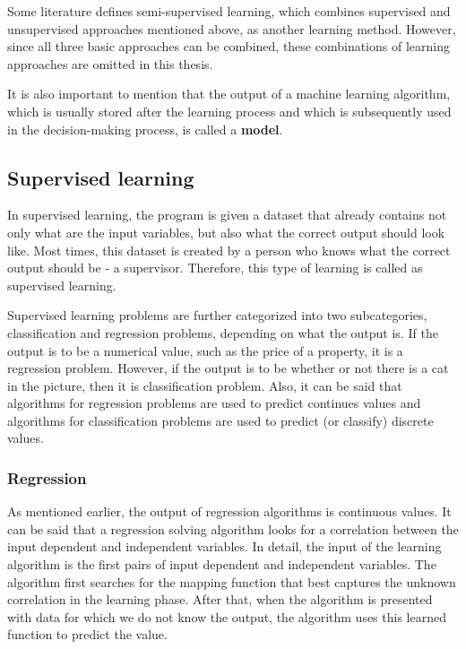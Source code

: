 Some literature\cite{ml-types1,ml-types2} defines semi-supervised learning, which combines supervised and unsupervised approaches mentioned above, as another learning method. However, since all three basic approaches can be combined, these combinations of learning approaches are omitted in this thesis.

It is also important to mention that the output of a machine learning algorithm, which is usually stored after the learning process and which is subsequently used in the decision-making process, is called a \textbf{model}\cite{algorithms-vs-models}.

\subsection{Supervised learning}

In supervised learning, the program is given a dataset that already contains not only what are the input variables, but also what the correct output should look like. Most times, this dataset is created by a person who knows what the correct output should be - a supervisor. Therefore, this type of learning is called as supervised learning.\cite{all-models}

Supervised learning problems are further categorized into two subcategories, classification and regression problems, depending on what the output is\cite{coursera-ml}. If the output is to be a numerical value, such as the price of a property, it is a regression problem. However, if the output is to be whether or not there is a cat in the picture, then it is classification problem. Also, it can be said that algorithms for regression problems are used to predict continues values and algorithms for classification problems are used to predict (or classify) discrete values.

\subsubsection{Regression}
As mentioned earlier, the output of regression algorithms is continuous values. It can be said that a regression solving algorithm looks for a correlation between the input dependent and independent variables. In detail, the input of the learning algorithm is the first pairs of input dependent and independent variables. The algorithm first searches for the mapping function that best captures the unknown correlation in the learning phase. After that, when the algorithm is presented with data for which we do not know the output, the algorithm uses this learned function to predict the value.

